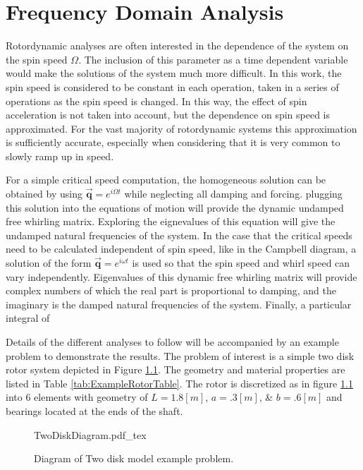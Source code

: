 \chapter{Frequency Domain Analysis}\label{FrequencyDomainAnalysis}
 Rotordynamic analyses are often interested in the dependence of the system on the spin speed $ \Omega $. The inclusion of this parameter as a time dependent variable would make the solutions of the system much more difficult. In this work, the spin speed is considered to be constant in each operation, taken in a series of operations as the spin speed is changed. In this way, the effect of spin acceleration is not taken into account, but the dependence on spin speed is approximated. For the vast majority of rotordynamic systems this approximation is sufficiently accurate, especially when considering that it is very common to slowly ramp up in speed.\par
For a simple critical speed computation, the homogeneous solution can be obtained by using $ \vec{\mathbf{q}}=e^{i\Omega t} $ while neglecting all damping and forcing. plugging this solution into the equations of motion will provide the dynamic undamped free whirling matrix. Exploring the eignevalues of this equation will give the undamped natural frequencies of the system. In the case that the critical speeds need to be calculated independent of spin speed, like in the Campbell diagram, a solution of the form $  \vec{\mathbf{q}}=e^{i\omega t}$ is used so that the spin speed and whirl speed can vary independently. Eigenvalues of this dynamic free whirling matrix will provide complex numbers of which the real part is proportional to damping, and the imaginary is the damped natural frequencies of the system. Finally, a particular integral of \par 
Details of the different analyses to follow will be accompanied by an example problem to demonstrate the results. The problem of interest is a simple two disk rotor system depicted in Figure \ref{fig:TwoDiskDiagram}. The geometry and material properties are listed in Table \ref{tab:ExampleRotorTable}. The rotor is discretized as in figure \ref{fig:TwoDiskDiagram} into 6 elements with geometry of $ L=1.8[m] $, $ a=.3[m] $, \& $ b=.6[m] $ and bearings located at the ends of the shaft.\par 
\begin{figure}
	\centering
	\def\svgwidth{400pt}
	{TwoDiskDiagram.pdf_tex}
	\caption{Diagram of Two disk model example problem.}
	\label{fig:TwoDiskDiagram}
\end{figure}
